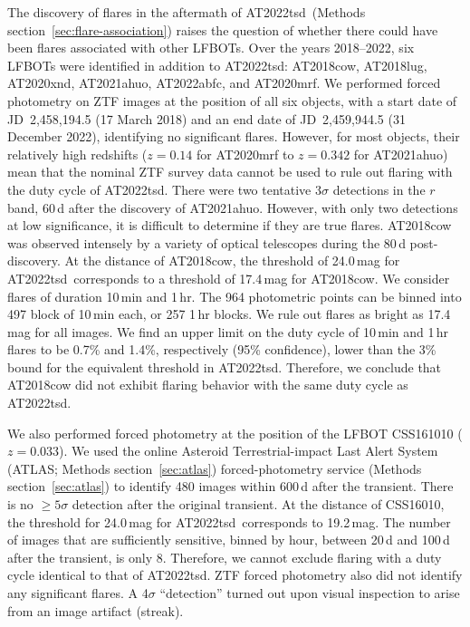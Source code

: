 \documentclass{nature_plusfigure}
\newcommand{\at}{AT2022tsd}
\begin{document}
\begin{methods}
The discovery of flares in the aftermath of \at\ (Methods section~\ref{sec:flare-association}) raises the question of whether there could have been flares associated with other LFBOTs. 
Over the years 2018--2022, six LFBOTs were identified in addition to \at: AT2018cow\cite{Prentice2018}, AT2018lug\cite{Ho2020_Koala}, AT2020xnd\cite{Perley2021}, AT2021ahuo, AT2022abfc\cite{Ho2022_AT2022abfc},  
and AT2020mrf\cite{Yao2022}. 
We performed forced photometry on ZTF images at the position of all six objects, with a start date of JD~2,458,194.5 (17 March 2018) and an end date of JD~2,459,944.5 (31 December 2022), identifying no significant flares.
However, for most objects, their relatively high redshifts ($z=0.14$ for AT2020mrf\cite{Yao2022} to $z=0.342$ for AT2021ahuo) mean that the nominal ZTF survey data cannot be used to rule out flaring with the duty cycle of \at.
There were two tentative 3$\sigma$ detections in the $r$ band, 60\,d after the discovery of AT2021ahuo. However, with only two detections at low significance, it is difficult to determine if they are true flares.
AT2018cow was observed intensely by a variety of optical telescopes during the 80\,d post-discovery\cite{Perley2019}. At the distance of AT2018cow, the threshold of 24.0\,mag for \at\ corresponds to a threshold of 17.4\,mag for AT2018cow. We consider flares of duration 10\,min and 1\,hr. The 964 photometric points can be binned into 497 block of 10\,min each, or 257 1\,hr blocks. We rule out flares as bright as 17.4\,mag for all images. We find an upper limit on the duty cycle of 10\,min and 1\,hr flares to be 0.7\% and 1.4\%, respectively (95\% confidence), lower than the 3\% bound for the equivalent threshold in \at. Therefore, we conclude that AT2018cow did not exhibit flaring behavior with the same duty cycle as \at.

We also performed forced photometry at the position of the LFBOT CSS161010\cite{Coppejans2020} ($z=0.033$). 
We used the online Asteroid Terrestrial-impact Last Alert System (ATLAS; Methods section~\ref{sec:atlas})
forced-photometry service (Methods section~\ref{sec:atlas}) to identify 480 images within 600\,d after the transient. There is no $\geq5\sigma$ detection after the original transient. At the distance of CSS16010, the threshold for 24.0\,mag for \at\ corresponds to 19.2\,mag. The number of images that are sufficiently sensitive, binned by hour, between 20\,d and 100\,d after the transient, is only 8. Therefore, we cannot exclude flaring with a duty cycle identical to that of \at.
ZTF forced photometry also did not identify any significant flares. A 4$\sigma$ ``detection'' turned out upon visual inspection to arise from an image artifact (streak). 


\end{methods}
\end{document}
